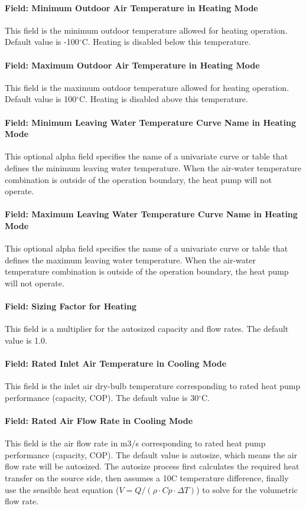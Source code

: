 \paragraph{Field: Minimum Outdoor Air Temperature in Heating Mode} This field is
the minimum outdoor temperature allowed for heating operation. Default value is
-100$^\circ$C. Heating is disabled below this temperature.
\paragraph{Field: Maximum Outdoor Air Temperature in Heating Mode} This field is
the maximum outdoor temperature allowed for heating operation. Default value is
100$^\circ$C. Heating is disabled above this temperature.
\paragraph{Field: Minimum Leaving Water Temperature Curve Name in Heating Mode}
This optional alpha field specifies the name of a univariate curve or table that defines
the minimum leaving water temperature. When the air-water temperature combination is outside of
the operation boundary, the heat pump will not operate.
\paragraph{Field: Maximum Leaving Water Temperature Curve Name in Heating Mode}
This optional alpha field specifies the name of a univariate curve or table that defines
the maximum leaving water temperature. When the air-water temperature combination is outside of
the operation boundary, the heat pump will not operate.
\paragraph{Field: Sizing Factor for Heating} This field is a multiplier for the
autosized capacity and flow rates. The default value is 1.0.
\paragraph{Field: Rated Inlet Air Temperature in Cooling Mode} This field is the
inlet air dry-bulb temperature corresponding to rated heat pump performance
(capacity, COP). The default value is 30$^\circ$C.
\paragraph{Field: Rated Air Flow Rate in Cooling Mode} This field is the air
flow rate in m3/s corresponding to rated heat pump performance (capacity, COP).
The default value is autosize, which means the air flow rate will be autosized.
The autosize process first calculates the required heat transfer on the source
side, then assumes a 10C temperature difference, finally use the sensible heat
equation ($V = Q / (\rho \cdot Cp \cdot \Delta T)$) to solve for the volumetric flow rate.

